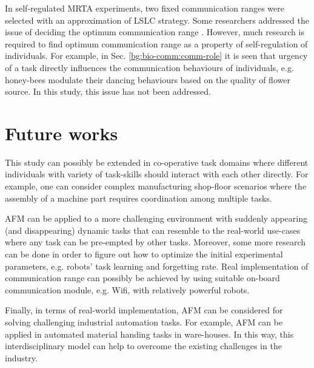 In self-regulated MRTA experiments, two fixed communication ranges  were selected with an approximation of LSLC strategy. Some researchers addressed the issue of deciding the optimum communication range \cite{Yoshida+2000}. However, much research is required to find optimum communication range as a property of self-regulation of individuals. For example, in Sec. \ref{bg:bio-comm:comm-role}  it is seen that urgency of a task directly influences the communication behaviours of individuals, e.g. honey-bees modulate their dancing behaviours based on the quality of flower source. In this study, this issue has not been addressed.

\section{Future works}
This study can possibly be extended in co-operative task domains where different individuals with variety of task-skills should interact with each other directly. For example,  one can consider complex manufacturing shop-floor scenarios where the assembly of a machine part requires coordination among multiple tasks. 

AFM can be applied to a more challenging environment with suddenly appearing (and disappearing) dynamic tasks that can resemble to the real-world use-cases where any task can be pre-empted by other tasks. Moreover, some more research can be done in order to figure out how to optimize the initial experimental parameters, e.g. robots' task learning and forgetting rate. Real implementation of communication range can possibly be achieved by using suitable on-board communication module, e.g. Wifi, with  relatively powerful robots.

Finally, in terms of real-world implementation, AFM can be considered for solving challenging industrial automation tasks. For example, AFM can be applied in automated material handing tasks in ware-houses. In this way, this interdisciplinary model can help to overcome the existing challenges in the industry.